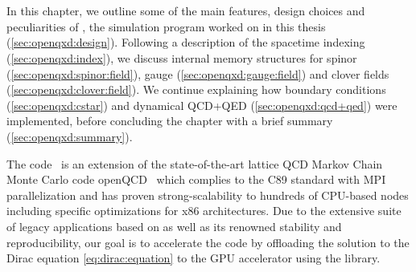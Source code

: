 \chapter{\texorpdfstring{\openqxd}{openQxD}}
\label{ch:p1:openqxd}




In this chapter, we outline some of the main features, design choices and peculiarities of \openqxd, the simulation program worked on in this thesis (\cref{sec:openqxd:design}).
Following a description of the spacetime indexing (\cref{sec:openqxd:index}), we discuss internal memory structures for spinor (\cref{sec:openqxd:spinor:field}), gauge (\cref{sec:openqxd:gauge:field}) and clover fields (\cref{sec:openqxd:clover:field}).
We continue explaining how \Cstar boundary conditions (\cref{sec:openqxd:cstar}) and dynamical QCD+QED (\cref{sec:openqxd:qcd+qed}) were implemented, before concluding the chapter with a brief summary (\cref{sec:openqxd:summary}).

The \openqxd code~\cite{openqxd} is an extension of the state-of-the-art lattice QCD Markov Chain Monte Carlo code openQCD~\cite{online:openqcd,Luscher:2012av} which complies to the C89 standard with MPI parallelization and has proven strong-scalability to hundreds of CPU-based nodes including specific optimizations for x86 architectures.
Due to the extensive suite of legacy applications based on \openqcd as well as its renowned stability and reproducibility, our goal is to accelerate the code by offloading the solution to the Dirac equation \cref{eq:dirac:equation} to the GPU accelerator using the \quda library.


